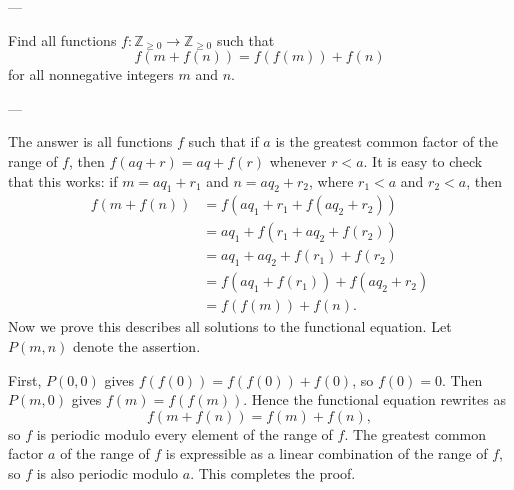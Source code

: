 
---

Find all functions $f:\mathbb Z_{\ge0}\to\mathbb Z_{\ge0}$ such that \[f(m+f(n))=f(f(m))+f(n)\]
for all nonnegative integers $m$ and $n$.

---

The answer is all functions $f$ such that if $a$ is the greatest common factor of the range of $f$, then $f(aq+r)=aq+f(r)$ whenever $r<a$. It is easy to check that this works: if $m=aq_1+r_1$ and $n=aq_2+r_2$, where $r_1<a$ and $r_2<a$, then
\begin{align*}
    f(m+f(n))&=f(aq_1+r_1+f(aq_2+r_2))\\
    &=aq_1+f(r_1+aq_2+f(r_2))\\
    &=aq_1+aq_2+f(r_1)+f(r_2)\\
    &=f(aq_1+f(r_1))+f(aq_2+r_2)\\
    &=f(f(m))+f(n).
\end{align*}
Now we prove this describes all solutions to the functional equation. Let $P(m,n)$ denote the assertion.

First, $P(0,0)$ gives $f(f(0))=f(f(0))+f(0)$, so $f(0)=0$. Then $P(m,0)$ gives $f(m)=f(f(m))$. Hence the functional equation rewrites as \[f(m+f(n))=f(m)+f(n),\]
so $f$ is periodic modulo every element of the range of $f$. The greatest common factor $a$ of the range of $f$ is expressible as a linear combination of the range of $f$, so $f$ is also periodic modulo $a$. This completes the proof.

